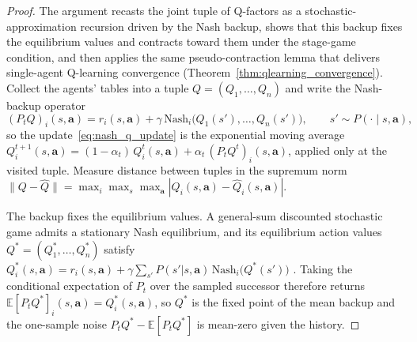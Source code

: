 \begin{proof}
The argument recasts the joint tuple of Q-factors as a stochastic-approximation recursion driven by the Nash backup, shows that this backup fixes the equilibrium values and contracts toward them under the stage-game condition, and then applies the same pseudo-contraction lemma that delivers single-agent Q-learning convergence (Theorem~\ref{thm:qlearning_convergence}). Collect the agents' tables into a tuple $Q = (Q_1, \ldots, Q_n)$ and write the Nash-backup operator
\[
(P_t Q)_i(s, \mathbf{a}) = r_i(s, \mathbf{a}) + \gamma\, \mathrm{Nash}_i\bigl(Q_1(s'), \ldots, Q_n(s')\bigr), \qquad s' \sim P(\cdot \mid s, \mathbf{a}),
\]
so the update~\eqref{eq:nash_q_update} is the exponential moving average $Q_i^{t+1}(s,\mathbf{a}) = (1-\alpha_t)\, Q_i^t(s,\mathbf{a}) + \alpha_t\, (P_t Q^t)_i(s,\mathbf{a})$, applied only at the visited tuple. Measure distance between tuples in the supremum norm $\|Q - \hat{Q}\| = \max_i \max_s \max_{\mathbf{a}} |Q_i(s,\mathbf{a}) - \hat{Q}_i(s,\mathbf{a})|$.

The backup fixes the equilibrium values. A general-sum discounted stochastic game admits a stationary Nash equilibrium, and its equilibrium action values $Q^* = (Q_1^*, \ldots, Q_n^*)$ satisfy $Q_i^*(s,\mathbf{a}) = r_i(s,\mathbf{a}) + \gamma \sum_{s'} P(s'|s,\mathbf{a})\, \mathrm{Nash}_i\bigl(Q^*(s')\bigr)$ \citep{hu2003nash}. Taking the conditional expectation of $P_t$ over the sampled successor therefore returns $\mathbb{E}[P_t Q^*]_i(s,\mathbf{a}) = Q_i^*(s,\mathbf{a})$, so $Q^*$ is the fixed point of the mean backup and the one-sample noise $P_t Q^* - \mathbb{E}[P_t Q^*]$ is mean-zero given the history.


\end{proof}
